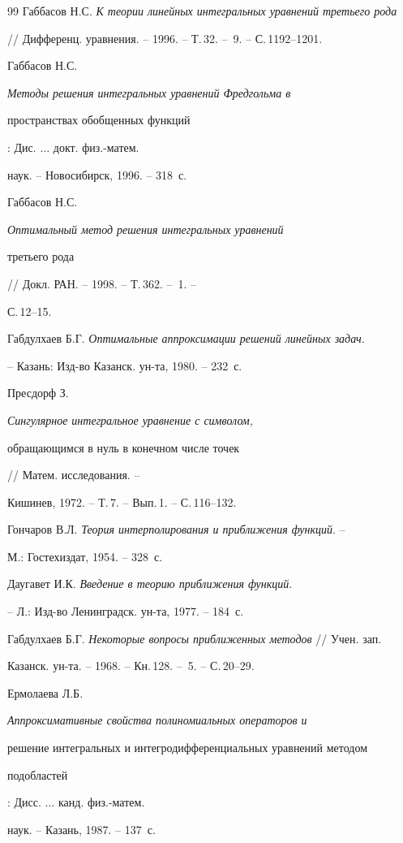 \begin{thebibliography}{99}
Габбасов Н.С. {\em К теории линейных интегральных уравнений третьего рода} 


// Дифференц. уравнения. -- 1996. -- Т.\,32. -- \No\,9. -- С.\,1192--1201. 




Габбасов Н.С. {\em Методы решения интегральных уравнений Фредгольма в 


пространствах обобщенных функций}: Дис. $\dotsc$ докт. физ.-матем. 


наук. -- Новосибирск, 1996. -- 318~с. 




Габбасов Н.С. {\em Оптимальный метод решения интегральных уравнений 


третьего рода} // Докл. РАН. -- 1998. -- Т.\,362. -- \No\,1. -- 


С.\,12--15. 




Габдулхаев Б.Г. {\em Оптимальные аппроксимации решений линейных задач}. 


-- Казань: Изд-во Казанск. ун-та, 1980. -- 232~с. 




Пресдорф З. {\em Сингулярное интегральное уравнение с символом, 


обращающимся в нуль в конечном числе точек} // Матем. исследования. -- 


Кишинев, 1972. -- Т.\,7. -- Вып.\,1. -- С.\,116--132. 




Гончаров В.Л. {\em Теория интерполирования и приближения функций}. -- 


М.: Гостехиздат, 1954. -- 328~с. 




Даугавет И.К. {\em Введение в теорию приближения функций}. 


-- Л.: Изд-во Ленинградск. ун-та, 1977. -- 184~с. 




Габдулхаев Б.Г. {\em Некоторые вопросы приближенных методов} // Учен. зап. 


Казанск. ун-та. -- 1968. -- Кн.\,128. -- \No\,5. -- С.\,20--29. 




Ермолаева Л.Б. {\em Аппроксимативные свойства полиномиальных операторов и 


решение интегральных и интегродифференциальных уравнений методом 


подобластей}: Дисс. $\dotsc$ канд. физ.-матем. 


наук. -- Казань, 1987. -- 137~с. 


 


\end{thebibliography} 


 


\vskip 2cm 


 






 


\label{end} 


 


